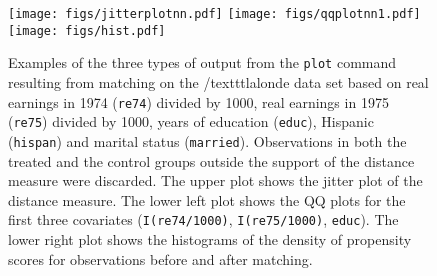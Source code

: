\begin{figure}
  \begin{center}
  \texttt{[image: figs/jitterplotnn.pdf]}
  \texttt{[image: figs/qqplotnn1.pdf]}
  \texttt{[image: figs/hist.pdf]}
  \caption{Examples of the three types of output from the
    \texttt{plot} command resulting from matching on the
    /texttt{lalonde} data set based on real earnings in 1974
    (\texttt{re74}) divided by 1000, real earnings in 1975
    (\texttt{re75}) divided by 1000, years of education
    (\texttt{educ}), Hispanic (\texttt{hispan}) and marital status
    (\texttt{married}).  Observations in both the treated and the
    control groups outside the support of the distance measure were
    discarded.  The upper plot shows the jitter plot of the distance
    measure.  The lower left plot shows the QQ plots for the first
    three covariates (\texttt{I(re74/1000)}, \texttt{I(re75/1000)},
    \texttt{educ}).  The lower right plot shows the histograms of the
    density of propensity scores for observations before and after
    matching.}
  \label{fig:plotcommandoutput}
\end{center}
\end{figure}


